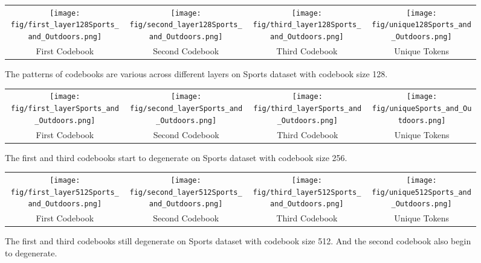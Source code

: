 \begin{figure*}[htb!]
		\centering
		\begin{tabular}{cccc}
\texttt{[image: fig/first\_layer128Sports\_and\_Outdoors.png]} &
       \texttt{[image: fig/second\_layer128Sports\_and\_Outdoors.png]}  & \texttt{[image: fig/third\_layer128Sports\_and\_Outdoors.png]}  &
       \texttt{[image: fig/unique128Sports\_and\_Outdoors.png]}
	     \\ First Codebook & Second Codebook & Third Codebook & Unique Tokens
		\end{tabular}
	\caption{The patterns of codebooks are various across different layers on Sports dataset with codebook size 128.}	\label{fig:vis_sports_128}
\end{figure*} 

\begin{figure*}[htb!]
		\centering
		\begin{tabular}{cccc}
\texttt{[image: fig/first\_layerSports\_and\_Outdoors.png]} &
       \texttt{[image: fig/second\_layerSports\_and\_Outdoors.png]}  & \texttt{[image: fig/third\_layerSports\_and\_Outdoors.png]}  &
       \texttt{[image: fig/uniqueSports\_and\_Outdoors.png]}
	     \\ First Codebook & Second Codebook & Third Codebook & Unique Tokens
      \end{tabular}
	\caption{The first and third codebooks start to degenerate on Sports dataset with codebook size 256.}	\label{fig:vis_sport_256}
\end{figure*} 


\begin{figure*}[htb!]
		\centering
		\begin{tabular}{cccc}
\texttt{[image: fig/first\_layer512Sports\_and\_Outdoors.png]} &
       \texttt{[image: fig/second\_layer512Sports\_and\_Outdoors.png]}  & \texttt{[image: fig/third\_layer512Sports\_and\_Outdoors.png]}  &
       \texttt{[image: fig/unique512Sports\_and\_Outdoors.png]}
	     \\ First Codebook & Second Codebook & Third Codebook & Unique Tokens
		\end{tabular}
	\caption{The first and third codebooks still degenerate on Sports dataset with codebook size 512. And the second codebook also begin to degenerate.}	\label{fig:vis_sports_512}
\end{figure*} 

